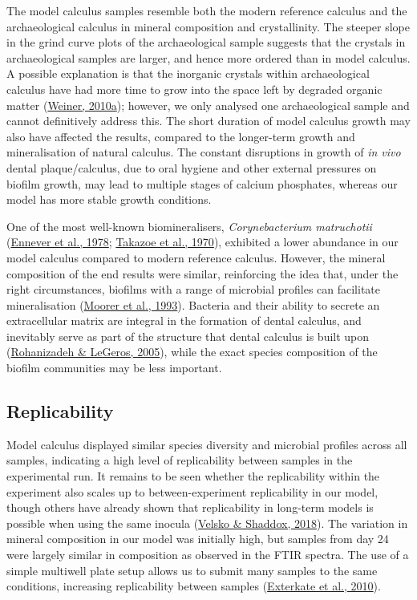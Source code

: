\documentclass[
  b5paper,
]{book}
\begin{document}
The model calculus samples resemble both the modern reference calculus
and the archaeological calculus in mineral composition and
crystallinity. The steeper slope in the grind curve plots of the
archaeological sample suggests that the crystals in archaeological
samples are larger, and hence more ordered than in model calculus. A
possible explanation is that the inorganic crystals within
archaeological calculus have had more time to grow into the space left
by degraded organic matter
(\protect\hyperlink{ref-weinerBiologicalMaterials2010}{Weiner, 2010a});
however, we only analysed one archaeological sample and cannot
definitively address this. The short duration of model calculus growth
may also have affected the results, compared to the longer-term growth
and mineralisation of natural calculus. The constant disruptions in
growth of \emph{in vivo} dental plaque/calculus, due to oral hygiene and
other external pressures on biofilm growth, may lead to multiple stages
of calcium phosphates, whereas our model has more stable growth
conditions.

One of the most well-known biomineralisers, \emph{Corynebacterium
matruchotii}
(\protect\hyperlink{ref-enneverCharacterizationBacterionema1978}{Ennever
et al., 1978};
\protect\hyperlink{ref-takazoeCalciumHydroxyapatite1970}{Takazoe et al.,
1970}), exhibited a lower abundance in our model calculus compared to
modern reference calculus. However, the mineral composition of the end
results were similar, reinforcing the idea that, under the right
circumstances, biofilms with a range of microbial profiles can
facilitate mineralisation
(\protect\hyperlink{ref-moorerCalcificationCariogenic1993}{Moorer et
al., 1993}). Bacteria and their ability to secrete an extracellular
matrix are integral in the formation of dental calculus, and inevitably
serve as part of the structure that dental calculus is built upon
(\protect\hyperlink{ref-rohanizadehUltrastructuralStudy2005}{Rohanizadeh
\& LeGeros, 2005}), while the exact species composition of the biofilm
communities may be less important.

\hypertarget{replicability}{%
\subsection{Replicability}\label{replicability}}

Model calculus displayed similar species diversity and microbial
profiles across all samples, indicating a high level of replicability
between samples in the experimental run. It remains to be seen whether
the replicability within the experiment also scales up to
between-experiment replicability in our model, though others have
already shown that replicability in long-term models is possible when
using the same inocula
(\protect\hyperlink{ref-velskoConsistentReproducible2018}{Velsko \&
Shaddox, 2018}). The variation in mineral composition in our model was
initially high, but samples from day 24 were largely similar in
composition as observed in the FTIR spectra. The use of a simple
multiwell plate setup allows us to submit many samples to the same
conditions, increasing replicability between samples
(\protect\hyperlink{ref-extercateAAA2010}{Exterkate et al., 2010}).
\end{document}
